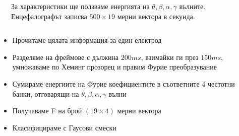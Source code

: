 \documentclass[9pt]{beamer}
\begin{document}
    \begin{frame}[t]
        \begin{columns}
            \begin{column}{0.48\textwidth}
            \end{column}
            \begin{column}{0.48\textwidth}
                \pause
                За характеристики ще ползваме енергията на  $\theta, \beta, \alpha, \gamma$ вълните.
                \pause
                Енцефалографът записва $500\times19$ мерни вектора в секунда.
            \end{column}
        \end{columns}
        \begin{itemize}
            \setlength\itemsep{\fill}
            \pause
            \item Прочитаме цялата информация за един електрод
            \pause
            \item Разделяме на фреймове с дължина $200ms$, взимайки ги през $150ms$, умножаваме по Хеминг прозорец и правим Фурие преобразувание
            \pause
            \item Сумираме енергиите на Фурие коефициентите в съответните 4 честотни банки, отговарящи на $\theta, \beta, \alpha, \gamma$ вълни
            \pause
            \item Получаваме F на брой $(19\times 4)$ мерни вектора
            \pause
            \item Класифицираме с Гаусови смески
        \end{itemize}
    \end{frame}
\end{document}
